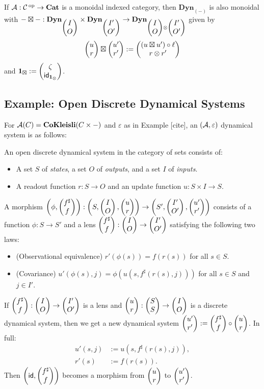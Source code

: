 If $\Aa : \Ca\op \to \Cat$ is a monoidal indexed category, then
$\textbf{Dyn}_{(-)}$ is also monoidal with $- \boxtimes - :
\textbf{Dyn}_{\lens{I}{O}} \times \textbf{Dyn}_{\lens{I'}{O'}} \to
\textbf{Dyn}_{\lens{I}{O} \otimes \lens{I'}{O'}}$ given by
$$\lens{u}{r} \boxtimes \lens{u'}{r'} := \lens{(u \boxtimes u') \circ \ell}{r
  \otimes r'}$$
and $\One_{\boxtimes} := \lens{\zeta}{\id_{\One_{\otimes}}}$.

\subsection{Example: Open Discrete Dynamical Systems}

For $\Aa(C) = \textbf{CoKleisli}(C \times -)$ and $\varepsilon$ as in Example
[cite], an $(\Aa, \varepsilon)$ dynamical system is as follows:

\begin{defn}
  An open discrete dynamical system in the category of sets consists of:
  \begin{itemize}
    \item A set $S$ of \emph{states}, a set $O$ of \emph{outputs}, and a set $I$
      of \emph{inputs}.
    \item A readout function $r : S \to O$ and an update function $u : S \times
      I \to S$.
  \end{itemize}
  A morphism $\left( \phi, \lens{f^{\sharp}}{f} \right) : \left( S, \lens{I}{O},
  \lens{u}{r} \right) \to \left( S', \lens{I'}{O'}, \lens{u'}{r'} \right)$
consists of a function $\phi : S \to S'$ and a lens $\lens{f^{\sharp}}{f} :
\lens{I}{O} \to \lens{I'}{O'}$ satisfying the following two laws:
\begin{itemize}
\item (Observational equivalence) $r'(\phi(s)) = f(r(s))$ for all $s \in S$.
\item (Covariance) $u'(\phi(s), j) = \phi(u(s, f^{\sharp}(r(s), j)))$ for all $s
  \in S$ and $j \in I'$.
\end{itemize} 
\end{defn}

If $\lens{f^{\sharp}}{f} : \lens{I}{O} \to \lens{I'}{O'}$ is a lens
and $\lens{u}{r} : \lens{S}{S} \to \lens{I}{O}$ is a discrete dynamical system,
then we get a new dynamical system $\lens{u'}{r'} := \lens{f^{\sharp}}{f} \circ
\lens{u}{r}$. In full:
\begin{align*}
u'(s, j) &:= u(s, f^{\sharp}(r(s), j)), \\
r'(s) &:= f(r(s)).
\end{align*}
Then $\left( \id, \lens{f^{\sharp}}{f} \right)$ becomes a morphism from
$\lens{u}{r}$ to $\lens{u'}{r'}$. 


